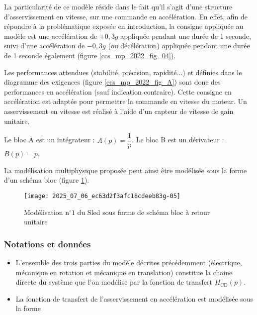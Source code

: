 La particularité de ce modèle réside dans le fait qu'il s'agit d'une structure d'asservissement en vitesse, sur une commande en accélération. En effet, afin de répondre à la problématique exposée en introduction, la consigne appliquée au modèle est une accélération de $+0,3 g$ appliquée pendant une durée de 1 seconde, suivi d'une accélération de $-0,3 g$ (ou décélération) appliquée pendant une durée de 1 seconde également (figure \ref{ccs_mp_2022_fig_04}).

Les performances attendues (stabilité, précision, rapidité...) et définies dans le diagramme des exigences (figure \ref{ccs_mp_2022_fig_A}) sont donc des performances en accélération (sauf indication contraire). Cette consigne en accélération est adaptée pour permettre la commande en vitesse du moteur. Un asservissement en vitesse est réalisé à l'aide d'un capteur de vitesse de gain unitaire.
\fi

\ifprof
\begin{corrige}
Le bloc A est un intégrateur : $A(p) = \dfrac{1}{p}$.
Le bloc B est un dérivateur : $B(p) = p$.
\end{corrige}
\else
\fi

\ifprof
\else
La modélisation multiphysique proposée peut ainsi être modélisée sous la forme d'un schéma bloc (figure \ref{ccs_mp_2022_fig_07}).

\begin{figure}[!h]
\centering
\texttt{[image: 2025\_07\_06\_ec63d2f3afc18cdeeb83g-05]}
\caption{\label{ccs_mp_2022_fig_07}Modélisation $\mathrm{n}^{\circ} 1$ du Sled sous forme de schéma bloc à retour unitaire}
\end{figure}




\subsubsection*{Notations et données}
\begin{itemize}
  \item L'ensemble des trois parties du modèle décrites précédemment (électrique, mécanique en rotation et mécanique en translation) constitue la chaine directe du système que l'on modélise par la fonction de transfert $H_{\mathrm{CD}}(p)$.
  \item La fonction de transfert de l'asservissement en accélération est modélisée sous la forme
\end{itemize}

